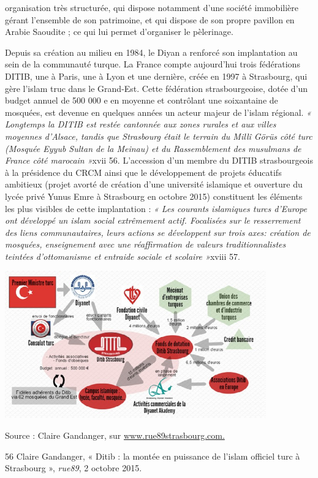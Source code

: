 organisation très structurée, qui dispose notamment d'une société
immobilière gérant l'ensemble de son patrimoine, et qui dispose de son
propre pavillon en Arabie Saoudite ; ce qui lui permet d'organiser le
pèlerinage.

Depuis sa création au milieu en 1984, le Diyan a renforcé son
implantation au sein de la communauté turque. La France compte
aujourd'hui trois fédérations DITIB, une à Paris, une à Lyon et une
dernière, créée en 1997 à Strasbourg, qui gère l'islam truc dans le
Grand-Est. Cette fédération strasbourgeoise, dotée d'un budget annuel de
500 000 e en moyenne et contrôlant une soixantaine de mosquées, est
devenue en quelques années un acteur majeur de l'islam régional. \emph{«
Longtemps la DITIB est restée cantonnée aux zones rurales et aux villes
moyennes d'Alsace, tandis que Strasbourg était le terrain du Millî Görüs
côté turc (Mosquée Eyyub Sultan de la Meinau) et du Rassemblement des
musulmans de France côté marocain »}xvii 56. L'accession d'un membre du
DITIB strasbourgeois à la présidence du CRCM ainsi que le développement
de projets éducatifs ambitieux (projet avorté de création d'une
université islamique et ouverture du lycée privé Yunus Emre à Strasbourg
en octobre 2015) constituent les éléments les plus visibles de cette
implantation : \emph{« Les courants islamiques turcs d'Europe ont
développé un islam social extrêmement actif. Focalisées sur le
resserrement des liens communautaires, leurs actions se développent sur
trois axes: création de mosquées, enseignement avec une réaffirmation de
valeurs traditionnalistes teintées d'ottomanisme et entraide sociale et
scolaire »}xviii 57.


\includegraphics[width=4.43662in,height=2.5in]{ImageIslamFrance/media/image8.jpeg}


Source : Claire Gandanger, sur
\href{http://www.rue89strasbourg.com/}{www.rue89strasbourg.com.}

56 Claire Gandanger, « Ditib : la montée en puissance de l'islam
officiel turc à Strasbourg », \emph{rue89}, 2 octobre 2015.

